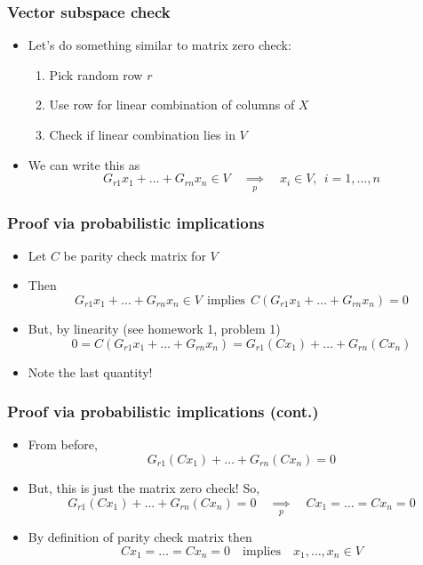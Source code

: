 \documentclass{beamer}
\newcommand{\impliesn}[1]{\underset{#1}{\implies}}
\newcommand{\impliesp}{\impliesn{p}}
\begin{document}
    \begin{frame}
        \frametitle{Vector subspace check}
        \begin{itemize}\itemsep=12pt
            \item Let's do something similar to matrix zero check:
            \begin{enumerate}\itemsep=8pt
                \item Pick random row $r$
                \item Use row for linear combination of columns of $X$
                \item Check if linear combination lies in $V$
            \end{enumerate}
            \pause
            \item We can write this as
            \[
                G_{r1}x_1 + \dots + G_{rn} x_n \in V \quad\impliesp\quad x_i \in V,~~i=1,\dots,n
            \]
        \end{itemize}
    \end{frame}

    \begin{frame}
        \frametitle{Proof via probabilistic implications}
        \begin{itemize}\itemsep=12pt
            \item Let $C$ be parity check matrix for $V$
            \item Then
            \[
                G_{r1}x_1 + \dots + G_{rn} x_n \in V ~~\text{implies}~~ C(G_{r1}x_1 + \dots + G_{rn} x_n) = 0
            \]
            \vspace{-2em}
            \pause
            \item But, by linearity (see homework 1, problem 1)
            \[
                0 = C(G_{r1}x_1 + \dots + G_{rn} x_n) = G_{r1}(Cx_1) + \dots + G_{rn}(Cx_n)
            \]
            \item Note the last quantity!
        \end{itemize}
    \end{frame}

    \begin{frame}
        \frametitle{Proof via probabilistic implications (cont.)}
        \begin{itemize}\itemsep=12pt
            \item From before,
            \[
                G_{r1}(Cx_1) + \dots + G_{rn}(Cx_n) = 0
            \]
            \item But, this is just the matrix zero check! \pause So,
            \[
                G_{r1}(Cx_1) + \dots + G_{rn}(Cx_n) = 0 \quad\impliesp\quad Cx_1 =\dots= Cx_n = 0
            \]
            \vspace{-2em}
            \pause
            \item By definition of parity check matrix then
            \[
                Cx_1 = \dots = Cx_n = 0 \quad \text{implies} \quad x_1, \dots, x_n \in V
            \]
        \end{itemize}
    \end{frame}
\end{document}
